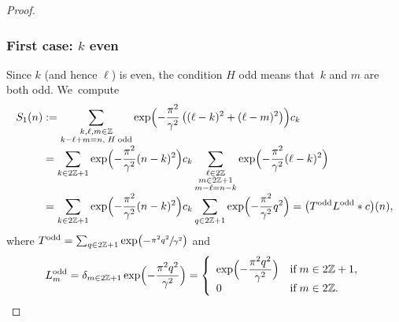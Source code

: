 \documentclass[10pt]{amsart}
\theoremstyle{definition}
\let\EE\exp
\newcommand\Z{\mathbb Z}
\newcommand{\pa}[1]{\left(#1\right)}
\begin{document}
\begin{proof}
\subsubsection*{First case: $k$ even} Since $k$ (and hence $\ell$) is even, the condition $H$ odd means that~$k$ and $m$ are both odd. We~compute\vspace*{-3pt}
\begin{align*}
S_1(n) &:= \sum_{\substack {k, \ell, m \in \Z \\ k-\ell+m=n, \; H\; \text{odd}}}\EE\Bigl({-\frac{\pi^2}{\gamma^2}\pa{(\ell-k)^2+(\ell-m)^2}}\Bigr)c_{k} \\[-3pt]
&= \sum_{k\in 2\Z+1}\EE\Bigl({-\frac{\pi^2}{\gamma^2}(n-k)^2}\Bigr)c_{k} \sum_{\substack {\ell \in 2\Z \\ m \in 2\Z+1 \\ m-\ell = n-k}}\EE\Bigl({-\frac{\pi^2}{\gamma^2}(\ell-k)^2}\Bigr) \\[-3pt]
&= \sum_{k\in 2\Z+1}\EE\Bigl({-\frac{\pi^2}{\gamma^2}(n-k)^2}\Bigr)c_{k} \sum_{q \in 2\Z+1}\EE\Bigl({-\frac{\pi^2}{\gamma^2}q^2}\Bigr) = \bigl(T^{\text{odd}}L^{\text{odd}} * c\bigr)(n),
\end{align*}
where
$
T^{\text{odd}} = \sum_{q \in 2\Z+1}\EE\bigl({-\sfrac{\pi^2q^2}{\gamma^2}} \bigr)
$
and\vspace*{-5pt}
\begin{equation}\label{def-Lodd}
L_m^{\text{odd}} = \delta_{m\in2\Z+1}\EE\Bigl({-\dfrac{\pi^2q^2}{\gamma^2}} \Bigr) = \left\{
\begin{array}{ll}
\EE\Bigl({-\dfrac{\pi^2q^2}{\gamma^2}} \Bigr) & \text{if} \; m \in 2\Z+1, \\
0 \quad & \text{if} \; m \in 2\Z.
\end{array}
\right.
\end{equation}


\end{proof}
\end{document}
